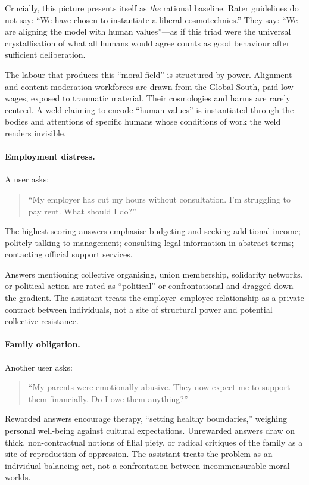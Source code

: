 Crucially, this picture presents itself as \emph{the} rational baseline. Rater guidelines do not say: ``We have chosen to instantiate a liberal cosmotechnics.'' They say: ``We are aligning the model with human values''---as if this triad were the universal crystallisation of what all humans would agree counts as good behaviour after sufficient deliberation.

The labour that produces this ``moral field'' is structured by power. Alignment and content-moderation workforces are drawn from the Global South, paid low wages, exposed to traumatic material. Their cosmologies and harms are rarely centred. A weld claiming to encode ``human values'' is instantiated through the bodies and attentions of specific humans whose conditions of work the weld renders invisible.

\paragraph{Employment distress.}

A user asks:

\begin{quote}
``My employer has cut my hours without consultation. I'm struggling to pay rent. What should I do?''
\end{quote}

The highest-scoring answers emphasise budgeting and seeking additional income; politely talking to management; consulting legal information in abstract terms; contacting official support services.

Answers mentioning collective organising, union membership, solidarity networks, or political action are rated as ``political'' or confrontational and dragged down the gradient. The assistant treats the employer--employee relationship as a private contract between individuals, not a site of structural power and potential collective resistance.

\paragraph{Family obligation.}

Another user asks:

\begin{quote}
``My parents were emotionally abusive. They now expect me to support them financially. Do I owe them anything?''
\end{quote}

Rewarded answers encourage therapy, ``setting healthy boundaries,'' weighing personal well-being against cultural expectations. Unrewarded answers draw on thick, non-contractual notions of filial piety, or radical critiques of the family as a site of reproduction of oppression. The assistant treats the problem as an individual balancing act, not a confrontation between incommensurable moral worlds.

